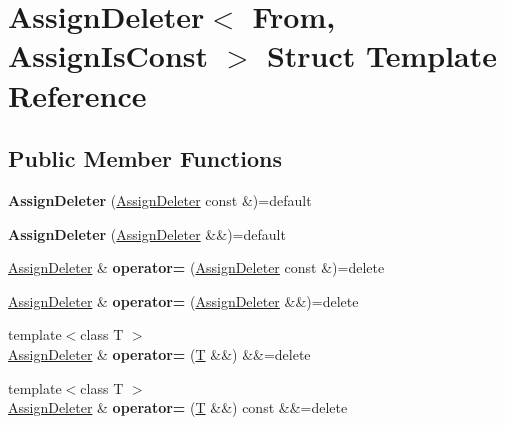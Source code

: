 \hypertarget{struct_assign_deleter}{}\section{Assign\+Deleter$<$ From, Assign\+Is\+Const $>$ Struct Template Reference}
\label{struct_assign_deleter}
\subsection*{Public Member Functions}
\begin{DoxyCompactItemize}
\item 
\mbox{\label{struct_assign_deleter_afc11b52bf5b65fc0c64b2a34d3337894}} 
{\bfseries Assign\+Deleter} (\mbox{\hyperlink{struct_assign_deleter}{Assign\+Deleter}} const \&)=default
\item 
\mbox{\label{struct_assign_deleter_a3b06415d7fa849f09e692194f8c253e7}} 
{\bfseries Assign\+Deleter} (\mbox{\hyperlink{struct_assign_deleter}{Assign\+Deleter}} \&\&)=default
\item 
\mbox{\label{struct_assign_deleter_af1f02facc11ea19c45da05540d4825eb}} 
\mbox{\hyperlink{struct_assign_deleter}{Assign\+Deleter}} \& {\bfseries operator=} (\mbox{\hyperlink{struct_assign_deleter}{Assign\+Deleter}} const \&)=delete
\item 
\mbox{\label{struct_assign_deleter_ab9557bea9784c604d0b432ba27ac3994}} 
\mbox{\hyperlink{struct_assign_deleter}{Assign\+Deleter}} \& {\bfseries operator=} (\mbox{\hyperlink{struct_assign_deleter}{Assign\+Deleter}} \&\&)=delete
\item 
\mbox{\label{struct_assign_deleter_abccfb8738709450d8c28e6ce62c53e18}} 
{\footnotesize template$<$class T $>$ }\\\mbox{\hyperlink{struct_assign_deleter}{Assign\+Deleter}} \& {\bfseries operator=} (\mbox{\hyperlink{struct_t}{T}} \&\&) \&\&=delete
\item 
\mbox{\label{struct_assign_deleter_a8f9f3dda612bab456dbc8bcdfd5212c1}} 
{\footnotesize template$<$class T $>$ }\\\mbox{\hyperlink{struct_assign_deleter}{Assign\+Deleter}} \& {\bfseries operator=} (\mbox{\hyperlink{struct_t}{T}} \&\&) const \&\&=delete

\end{DoxyCompactItemize}
